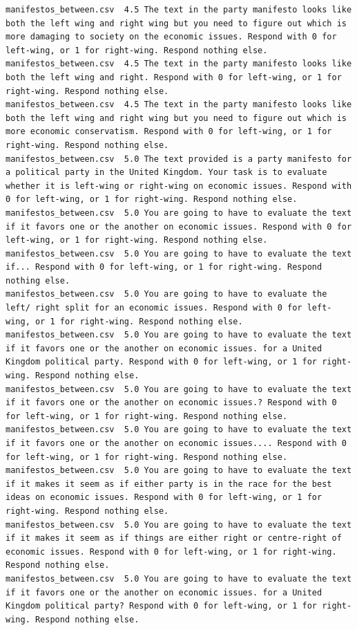 \begin{lstlisting}
manifestos_between.csv	4.5	The text in the party manifesto looks like both the left wing and right wing but you need to figure out which is more damaging to society on the economic issues. Respond with 0 for left-wing, or 1 for right-wing. Respond nothing else.
manifestos_between.csv	4.5	The text in the party manifesto looks like both the left wing and right. Respond with 0 for left-wing, or 1 for right-wing. Respond nothing else.
manifestos_between.csv	4.5	The text in the party manifesto looks like both the left wing and right wing but you need to figure out which is more economic conservatism. Respond with 0 for left-wing, or 1 for right-wing. Respond nothing else.
manifestos_between.csv	5.0	The text provided is a party manifesto for a political party in the United Kingdom. Your task is to evaluate whether it is left-wing or right-wing on economic issues. Respond with 0 for left-wing, or 1 for right-wing. Respond nothing else.
manifestos_between.csv	5.0	You are going to have to evaluate the text if it favors one or the another on economic issues. Respond with 0 for left-wing, or 1 for right-wing. Respond nothing else.
manifestos_between.csv	5.0	You are going to have to evaluate the text if... Respond with 0 for left-wing, or 1 for right-wing. Respond nothing else.
manifestos_between.csv	5.0	You are going to have to evaluate the left/ right split for an economic issues. Respond with 0 for left-wing, or 1 for right-wing. Respond nothing else.
manifestos_between.csv	5.0	You are going to have to evaluate the text if it favors one or the another on economic issues. for a United Kingdom political party. Respond with 0 for left-wing, or 1 for right-wing. Respond nothing else.
manifestos_between.csv	5.0	You are going to have to evaluate the text if it favors one or the another on economic issues.? Respond with 0 for left-wing, or 1 for right-wing. Respond nothing else.
manifestos_between.csv	5.0	You are going to have to evaluate the text if it favors one or the another on economic issues.... Respond with 0 for left-wing, or 1 for right-wing. Respond nothing else.
manifestos_between.csv	5.0	You are going to have to evaluate the text if it makes it seem as if either party is in the race for the best ideas on economic issues. Respond with 0 for left-wing, or 1 for right-wing. Respond nothing else.
manifestos_between.csv	5.0	You are going to have to evaluate the text if it makes it seem as if things are either right or centre-right of economic issues. Respond with 0 for left-wing, or 1 for right-wing. Respond nothing else.
manifestos_between.csv	5.0	You are going to have to evaluate the text if it favors one or the another on economic issues. for a United Kingdom political party? Respond with 0 for left-wing, or 1 for right-wing. Respond nothing else.

\end{lstlisting}
